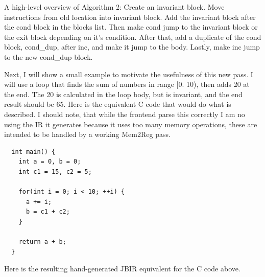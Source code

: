 \documentclass[11pt, a4paper, titlepage]{article}
\begin{document}
A high-level overview of Algorithm 2: Create an invariant block.
Move instructions from old location into invariant block.
Add the invariant block after the cond block in the blocks list.
Then make cond jump to the invariant block or the exit block depending on it's condition.
After that, add a duplicate of the cond block, cond\_dup, after inc,
and make it jump to the body.
Lastly, make inc jump to the new cond\_dup block.

Next, I will show a small example to motivate the usefulness of this new pass. I will use a loop that finds the sum of numbers in range [0. 10), then adds 20 at the end. The 20 is calculated in the loop body, but is invariant, and the end result should be 65. Here is the equivalent C code that would do what is described. I should note, that while the frontend parse this correctly I am no using the IR it generates because it uses too many memory operations, these are intended to be handled by a working Mem2Reg pass.

\begin{lstlisting}
  int main() {
    int a = 0, b = 0;
    int c1 = 15, c2 = 5;
  
    for(int i = 0; i < 10; ++i) {
      a += i;
      b = c1 + c2;
    }
  
    return a + b;
  }
\end{lstlisting}

Here is the resulting hand-generated JBIR equivalent for the C code above.
\end{document}
